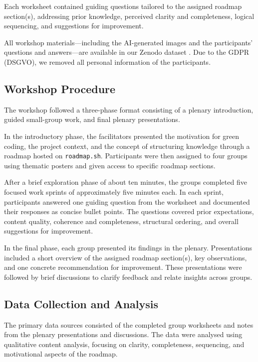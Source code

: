 \documentclass[english]{lni}
\begin{document}
Each worksheet contained guiding questions tailored to the assigned roadmap section(s), addressing prior knowledge, perceived clarity and completeness, logical sequencing, and suggestions for improvement.

All workshop materials—including the AI-generated images and the participants' questions and answers—are available in our Zenodo dataset \cite{junger_2026_workshop}. Due to the GDPR (DSGVO), we removed all personal information of the participants.

\subsection{Workshop Procedure}
The workshop followed a three-phase format consisting of a plenary introduction, guided small-group work, and final plenary presentations.

In the introductory phase, the facilitators presented the motivation for green coding, the project context, and the concept of structuring knowledge through a roadmap hosted on \texttt{roadmap.sh}. Participants were then assigned to four groups using thematic posters and given access to specific roadmap sections.

After a brief exploration phase of about ten minutes, the groups completed five focused work sprints of approximately five minutes each. In each sprint, participants answered one guiding question from the worksheet and documented their responses as concise bullet points. The questions covered prior expectations, content quality, coherence and completeness, structural ordering, and overall suggestions for improvement.

In the final phase, each group presented its findings in the plenary. Presentations included a short overview of the assigned roadmap section(s), key observations, and one concrete recommendation for improvement. These presentations were followed by brief discussions to clarify feedback and relate insights across groups.

\subsection{Data Collection and Analysis}
The primary data sources consisted of the completed group worksheets and notes from the plenary presentations and discussions. The data were analysed using qualitative content analysis, focusing on clarity, completeness, sequencing, and motivational aspects of the roadmap.
\end{document}
